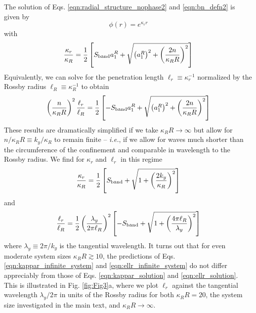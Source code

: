 \documentclass[%
 reprint,
superscriptaddress,
longbibliography,
 amsmath,amssymb,
 prl,
 citeautoscript,
]{revtex4-1}
\begin{document}
The solution of Eqs. \ref{eqn:radial_structure_nophase2} and \ref{eqn:bn_defn2} is given by
\begin{equation}
\phi(r) = e^{\kappa_r r}
\label{eqn:phi_solution}
\end{equation}
with
\begin{equation}
\frac{\kappa_r}{\kappa_R} = \frac{1}{2} \left[ S_{\rm band} a_1^R + \sqrt{\left( a_1^R \right)^2 + \left( \frac{2 n}{\kappa_R R} \right)^2} \right]
\label{eqn:kappar_solution}
\end{equation}
Equivalently, we can solve for the penetration length $\ell_r \equiv \kappa_r^{-1}$ normalized by the Rossby radius $\ell_R \equiv \kappa_R^{-1}$ to obtain
\begin{equation}
\begin{split}
\left( \frac{n}{\kappa_R R} \right)^2 \frac{\ell_r}{\ell_R} = \frac{1}{2} \left[ - S_{\rm band} a_1^R + \sqrt{\left( a_1^R \right)^2 + \left( \frac{2 n}{\kappa_R R} \right)^2} \right]
\end{split}
\label{eqn:ellr_solution}
\end{equation}
These results are dramatically simplified if we take $\kappa_R R \rightarrow \infty$ but allow for $n / \kappa_R R \equiv k_y / \kappa_R$ to remain finite -- {\it i.e.}, if we allow for waves much shorter than the circumference of the confinement and comparable in wavelength to the Rossby radius. We find for $\kappa_r$ and $\ell_r$ in this regime
\begin{equation}
\frac{\kappa_r}{\kappa_R} = \frac{1}{2} \left[ S_{\rm band} + \sqrt{1 + \left( \frac{2 k_y}{\kappa_R} \right)^2} \right]
\label{eqn:kappar_infinite_system}
\end{equation}
and
\begin{equation}
\frac{\ell_r}{\ell_R} = \frac{1}{2} \left( \frac{\lambda_y}{2 \pi \ell_R} \right)^2 \left[ - S_{\rm band} + \sqrt{1 + \left( \frac{4 \pi \ell_R}{\lambda_y} \right)^2} \right]
\label{eqn:ellr_infinite_system}
\end{equation}
where $\lambda_y \equiv 2 \pi / k_y$ is the tangential wavelength. It turns out that for even moderate system sizes $\kappa_R R \gtrsim 10$, the predictions of Eqs. \ref{eqn:kappar_infinite_system} and \ref{eqn:ellr_infinite_system} do not differ appreciably from those of Eqs. \ref{eqn:kappar_solution} and \ref{eqn:ellr_solution}. This is illustrated in Fig. \ref{fig:Fig3}a, where we plot $\ell_r$ against the tangential wavelength $\lambda_y / 2 \pi$ in units of the Rossby radius for both $\kappa_R R = 20$, the system size investigated in the main text, and $\kappa_R R \rightarrow \infty$.
\end{document}
